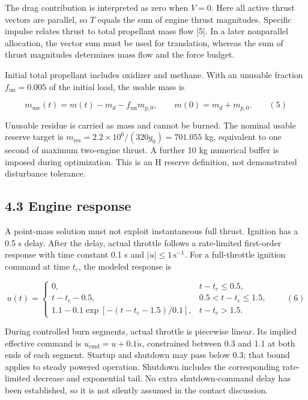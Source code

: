 \documentclass[
  11pt,
  a4paper,
]{article}
\begin{document}
The drag contribution is interpreted as zero when \(V=0\). Here all
active thrust vectors are parallel, so \(T\) equals the sum of engine
thrust magnitudes. Specific impulse relates thrust to total propellant
mass flow {[}5{]}. In a later nonparallel allocation, the vector sum
must be used for translation, whereas the sum of thrust magnitudes
determines mass flow and the force budget.

Initial total propellant includes oxidizer and methane. With an unusable
fraction \(f_{\mathrm{un}}=0.005\) of the initial load, the usable mass
is

\[ m_{\mathrm{use}}(t)=m(t)-m_d-f_{\mathrm{un}}m_{p,0},\qquad m(0)=m_d+m_{p,0}. \qquad (5) \]

Unusable residue is carried as mass and cannot be burned. The nominal
usable reserve target is
\(m_{\mathrm{res}}=2.2\times10^6/(320g_0)=701.055\) kg, equivalent to
one second of maximum two-engine thrust. A further 10 kg numerical
buffer is imposed during optimization. This is an H reserve definition,
not demonstrated disturbance tolerance.

\subsection{4.3 Engine response}\label{engine-response}

A point-mass solution must not exploit instantaneous full thrust.
Ignition has a 0.5 s delay. After the delay, actual throttle follows a
rate-limited first-order response with time constant 0.1 s and
\(|\dot u|\le1\,\mathrm{s^{-1}}\). For a full-throttle ignition command
at time \(t_c\), the modeled response is

\[
u(t)=\begin{cases}
0,&t-t_c\le0.5,\\
t-t_c-0.5,&0.5<t-t_c\le1.5,\\
1.1-0.1\exp[-(t-t_c-1.5)/0.1],&t-t_c>1.5.
\end{cases}\qquad (6)
\]

During controlled burn segments, actual throttle is piecewise linear.
Its implied effective command is \(u_{\mathrm{cmd}}=u+0.1\dot u\),
constrained between 0.3 and 1.1 at both ends of each segment. Startup
and shutdown may pass below 0.3; that bound applies to steady powered
operation. Shutdown includes the corresponding rate-limited decrease and
exponential tail. No extra shutdown-command delay has been established,
so it is not silently assumed in the contact discussion.
\end{document}
